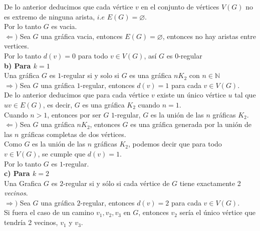 \documentclass[12pt]{article}
\begin{document}
De lo anterior deducimos que cada vértice $v$ en el conjunto de vértices $V(G)$ no es extremo 
de ninguna arista, $i.e$ $E(G) = \varnothing$.\\

Por lo tanto $G$ es vacia.\\

$\Longleftarrow)$ Sea $G$ una gráfica vacia, entonces $E(G) = \varnothing$, entonces no hay aristas entre vertices.\\

Por lo tanto $d(v) = 0$ para todo $v \in V(G)$, así $G$ es $0$-regular\\

\textbf{b) Para $k = 1$}\\

Una gráfica $G$ es $1$-regular si y solo si $G$ es una gráfica $nK_2$ con $n \in \mathbb{N}$\\

$\Longrightarrow)$ Sea $G$ una gráfica $1$-regular, entonces $d(v) = 1$ para cada $v \in V(G)$.\\

De lo anterior deducimos que para cada vértice $v$ existe un único vértice $u$ tal que $uv \in E(G)$, 
es decir, $G$  es una gráfica $K_2$ cuando $n = 1$.\\

Cuando $n > 1$, entonces por ser $G$ $1$-regular, $G$ es la unión de las $n$ gráficas $K_2$.\\

$\Longleftarrow)$ Sea $G$ una gráfica $nK_2$, entonces $G$ es una gráfica generada por la unión 
de las $n$ gráficas completas de dos vértices.\\

Como $G$ es la unión de las $n$ gráficas $K_2$, podemos decir que para todo $v \in V(G)$, se cumple que $d(v) = 1$.\\

Por lo tanto $G$ es $1$-regular.\\

\textbf{c) Para $k = 2$} \\

Una Grafica $G$ es $2$-regular si y sólo si cada vértice de $G$ tiene exactamente 2 \textit{vecinos}.\\

$\Longrightarrow)$ Sea $G$ una gráfica $2$-regular, entonces $d(v) = 2$ para cada $v \in V(G)$.\\

Si fuera el caso de un camino $v_1, v_2, v_3$ en $G$, entonces $v_2$ sería el único vértice que tendría 2 vecinos, $v_1$ y $v_3$.\\
\end{document}
